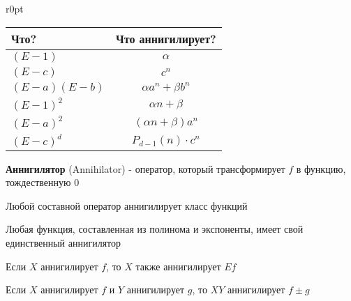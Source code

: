 \documentclass[12pt]{article}
\begin{document}
\begin{itemize}
        \vspace{4mm}

        \begin{minipage}{0.9\textwidth}

            \begin{wrapfigure}{r}{0pt}
        \begin{tabular}{lc}
            \hline

            \hfil Что? & Что аннигилирует? \\

            \hline

            $(E - 1)$ & $\alpha$ \\

            \hline

            $(E - c)$ & $c^n$ \\

            \hline

            $(E - a)(E - b)$ & $\alpha a^n + \beta b^n$ \\

            \hline

            $(E - 1)^2$ & $\alpha n + \beta$ \\

            \hline

            $(E - a)^2$ & $(\alpha n + \beta) a^n$ \\

            \hline

            $(E - c)^d$ & $P_{d - 1}(n) \cdot c^n$ \\

            \hline

        \end{tabular}

        \end{wrapfigure}

        \item \textbf{Аннигилятор} (Annihilator) - оператор, который трансформирует $f$ в функцию, тождественную $0$

        \Notas Любой составной оператор аннигилирует класс функций

        \Notas Любая функция, составленная из полинома и экспоненты, имеет свой единственный аннигилятор

        Если $X$ аннигилирует $f$, то $X$ также аннигилирует $Ef$

        Если $X$ аннигилирует $f$ и $Y$ аннигилирует $g$, то $XY$ аннигилирует $f \pm g$


\end{minipage}
\end{itemize}
\end{document}
